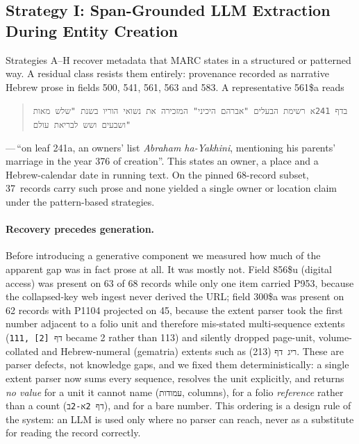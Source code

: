 \documentclass[Afour,sageh,times]{sagej}
\newcommand{\code}[1]{\texttt{#1}}
\begin{document}
\subsection{Strategy I: Span-Grounded LLM Extraction During Entity Creation}
\label{sec:llm-extraction}

Strategies A--H recover metadata that MARC states in a structured or patterned way. A residual class resists them entirely: provenance recorded as narrative Hebrew prose in fields 500, 541, 561, 563 and 583. A representative 561\$a reads

\begin{quote}
\small
\code{בדף 241א רשימת הבעלים "אברהם היכיני" המזכירה את נשואי הוריו בשנת "שלש מאות ושבעים ושש לבריאת עולם"}
\end{quote}

\noindent{}---\,``on leaf 241a, an owners' list \textit{Abraham ha-Yakhini}, mentioning his parents' marriage in the year 376 of creation''. This states an owner, a place and a Hebrew-calendar date in running text. On the pinned 68-record subset, 37~records carry such prose and none yielded a single owner or location claim under the pattern-based strategies.

\paragraph{Recovery precedes generation.}
Before introducing a generative component we measured how much of the apparent gap was in fact prose at all. It was mostly not. Field 856\$u (digital access) was present on 63 of 68 records while only one item carried P953, because the collapsed-key web ingest never derived the URL; field 300\$a was present on 62 records with P1104 projected on 45, because the extent parser took the first number adjacent to a folio unit and therefore mis-stated multi-sequence extents (\code{111, [2] דף} became 2 rather than 113) and silently dropped page-unit, volume-collated and Hebrew-numeral (gematria) extents such as \code{ריג דף} (213). These are parser defects, not knowledge gaps, and we fixed them deterministically: a single extent parser now sums every sequence, resolves the unit explicitly, and returns \emph{no value} for a unit it cannot name (\code{עמודות}, columns), for a folio \emph{reference} rather than a count (\code{דף 2א-2ב}), and for a bare number. This ordering is a design rule of the system: an LLM is used only where no parser can reach, never as a substitute for reading the record correctly.
\end{document}
